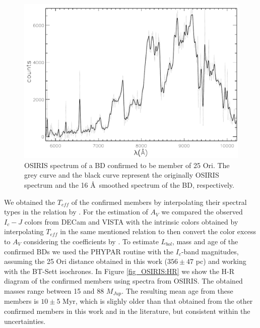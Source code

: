 \documentclass[12pt]{article}
\newcounter{subsubsubsection}[subsubsection]
\begin{document}
\begin{figure}%
	\includegraphics[width=1.0\textwidth]{member_OSIRIS.pdf}
	\caption[OSIRIS spectrum of a BD confirmed to be member of 25 Ori.]{OSIRIS spectrum of a BD confirmed to be member of 25 Ori. The grey curve and the black curve represent the originally OSIRIS spectrum and the 16 \AA\ smoothed spectrum of the BD, respectively.}
	\label{fig_OSIRIS:spectrum}
\end{figure}

\label{sec_OSIRIS:parameters}
We obtained the $T_{eff}$ of the confirmed members by interpolating their spectral types in the relation by \citet{Pecaut2013}. For the estimation of $A_V$ we compared the observed $I_c-J$ colors from DECam and VISTA with the intrinsic colors obtained by interpolating $T_{eff}$ in the same mentioned relation to then convert the color excess to $A_V$ considering the coefficients by \citet{Cardelli1989}. To estimate $L_{bol}$, mass and age of the confirmed BDs we used the PHYPAR routine with the $I_c$-band magnitudes, assuming the 25 Ori distance obtained in this work ($356\pm47$ pc) and working with the BT-Sett isochrones. In Figure \ref{fig_OSIRIS:HR} we show the H-R diagram of the confirmed members using spectra from OSIRIS. The obtained masses range between 15 and 88 $M_{Jup}$. The resulting mean age from these members is $10\pm5$ Myr, which is slighly older than that obtained from the other confirmed members in this work and in the literature, but consistent within the uncertainties.
\end{document}
